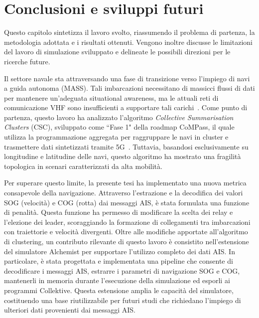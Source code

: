 \chapter{Conclusioni e sviluppi futuri}
\label{chap:conclusioni}

Questo capitolo sintetizza il lavoro svolto, riassumendo il problema di partenza, la metodologia adottata e i risultati ottenuti. Vengono inoltre discusse le limitazioni del lavoro di simulazione sviluppato e delineate le possibili direzioni per le ricerche future.

Il settore navale sta attraversando una fase di transizione verso l'impiego di navi a guida autonoma (\ac{MASS}). Tali imbarcazioni necessitano di massicci flussi di dati per mantenere un'adeguata situational awareness, ma le attuali reti di comunicazione \ac{VHF} sono insufficienti a supportare tali carichi~\cite{11217861}. Come punto di partenza, questo lavoro ha analizzato l'algoritmo \emph{Collective Summarisation Clusters} (\ac{CSC}), sviluppato come ``Fase 1" della roadmap CoMPass, il quale utilizza la programmazione aggregata per raggruppare le navi in cluster e trasmettere dati sintetizzati tramite 5G~\cite{11217861, roadmap}. Tuttavia, basandosi esclusivamente su longitudine e latitudine delle navi, questo algoritmo ha mostrato una fragilità topologica in scenari caratterizzati da alta mobilità. 

Per superare questo limite, la presente tesi ha implementato una nuova metrica consapevole della navigazione. Attraverso l'estrazione e la decodifica dei valori \ac{SOG} (velocità) e \ac{COG} (rotta) dai messaggi \ac{AIS}, è stata formulata una funzione di penalità. Questa funzione ha permesso di modificare la scelta dei relay e l'elezione dei leader, scoraggiando la formazione di collegamenti tra imbarcazioni con traiettorie e velocità divergenti. Oltre alle modifiche apportate all'algoritmo di clustering, un contributo rilevante di questo lavoro è consistito nell'estensione del simulatore Alchemist per supportare l'utilizzo completo dei dati \ac{AIS}. In particolare, è stata progettata e implementata una pipeline che consente di decodificare i messaggi \ac{AIS}, estrarre i parametri di navigazione \ac{SOG} e \ac{COG}, mantenerli in memoria durante l'esecuzione della simulazione ed esporli ai programmi Collektive. Questa estensione amplia le capacità del simulatore, costituendo una base riutilizzabile per futuri studi che richiedano l'impiego di ulteriori dati provenienti dai messaggi \ac{AIS}.


